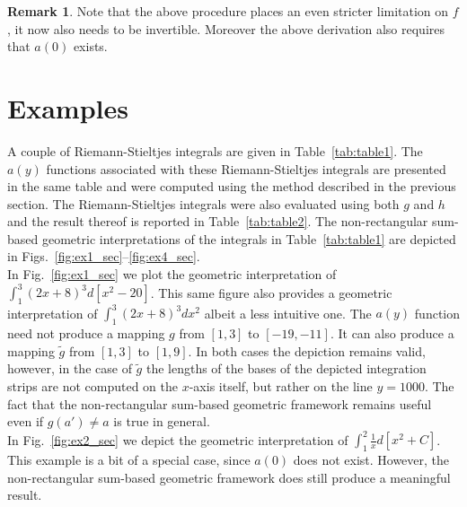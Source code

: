 \documentclass{article}
\theoremstyle{theorem}
\theoremstyle{definition}
\newtheorem*{remark}{Remark}
\begin{document}
\begin{remark}
Note that the above procedure places an even stricter limitation on $f$, it now also needs to be invertible. Moreover the 
above derivation also requires that $a(0)$ exists.
\end{remark}


\section{Examples}
A couple of Riemann-Stieltjes integrals are given in Table~\ref{tab:table1}. The $a(y)$ functions associated 
with these Riemann-Stieltjes integrals are presented in the same table and were computed using the method 
described in the previous section. The Riemann-Stieltjes integrals were also evaluated using both $g$ and $h$ and the result
thereof is reported in Table~\ref{tab:table2}. The non-rectangular sum-based geometric interpretations of the integrals in Table~\ref{tab:table1} are depicted in Figs.~\ref{fig:ex1_sec}--\ref{fig:ex4_sec}.\\

\noindent
In Fig.~\ref{fig:ex1_sec} we plot the geometric interpretation of $\int_{1}^3 (2x+8)^3 d[x^2-20]$. This same figure also 
provides a geometric interpretation of $\int_{1}^3 (2x+8)^3 dx^2$ albeit a less intuitive one. The $a(y)$ function need not 
produce a mapping $g$ from $[1,3]$ to $[-19,-11]$. It can also produce a mapping $\widetilde{g}$ from $[1,3]$ to $[1,9]$. In both cases the 
depiction remains valid, however, in the case of $\widetilde{g}$ the lengths of the bases of the depicted integration strips are not 
computed on the $x$-axis itself, but rather on the line $y=1000$. The fact that the non-rectangular sum-based geometric framework remains useful even if $g(a')\neq a$ is true in general.\\

\noindent
In Fig.~\ref{fig:ex2_sec} we depict the geometric interpretation of $\int_1^2 \frac{1}{x} d[x^2+C]$. This example is a bit of a special case, since $a(0)$ does not exist. 
However, the non-rectangular sum-based geometric framework does still produce a meaningful result.\\  
\end{document}
